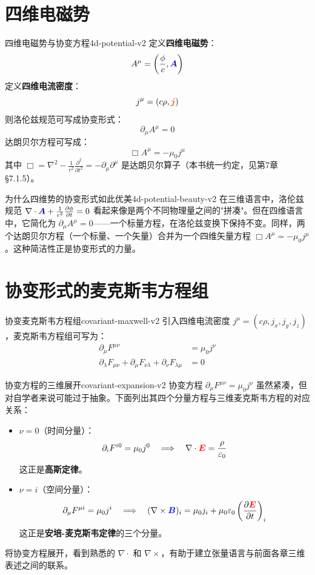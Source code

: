 \documentclass[11pt,a4paper,openany,oneside]{book}
\newcommand{\vecE}{\textcolor{red}{\vect{E}}}
\newcommand{\vecB}{\textcolor{blue}{\vect{B}}}
\newcommand{\vecJ}{\textcolor{cororange}{\vect{j}}}
\newcommand{\vecA}{\textcolor{blue!70!black}{\vect{A}}}
\newcommand{\eps}{\varepsilon}
\newcommand{\muz}{\mu_0}
\newcommand{\vect}[1]{\bm{#1}}
\newcommand{\curl}{\nabla\times}
\newcommand{\divg}{\nabla\cdot}
\newcommand{\lap}{\nabla^2}
\begin{document}
\section{四维电磁势}

\begin{theorem}{四维电磁势与协变方程}{4d-potential-v2}
定义\textbf{四维电磁势}：
\[
A^\mu = \left(\frac{\phi}{c}, \vecA\right)
\]
定义\textbf{四维电流密度}：
\[
j^\mu = (c\rho, \vecJ)
\]
则洛伦兹规范可写成协变形式：
\[
\partial_\mu A^\mu = 0
\]
达朗贝尔方程可写成：
\[
\Box A^\mu = -\muz j^\mu
\]
其中 $\Box = \lap - \frac{1}{c^2}\frac{\partial^2}{\partial t^2} = -\partial_\mu\partial^\mu$ 是达朗贝尔算子（本书统一约定，见第7章 §7.1.5）。
\end{theorem}

\begin{insight}{为什么四维势的协变形式如此优美}{4d-potential-beauty-v2}
在三维语言中，洛伦兹规范 $\divg\vecA + \frac{1}{c^2}\frac{\partial\phi}{\partial t} = 0$ 看起来像是两个不同物理量之间的"拼凑"。但在四维语言中，它简化为 $\partial_\mu A^\mu = 0$——一个标量方程，在洛伦兹变换下保持不变。同样，两个达朗贝尔方程（一个标量、一个矢量）合并为一个四维矢量方程 $\Box A^\mu = -\muz j^\mu$。这种简洁性正是协变形式的力量。
\end{insight}

\section{协变形式的麦克斯韦方程组}

\begin{theorem}{协变麦克斯韦方程组}{covariant-maxwell-v2}
引入四维电流密度 $j^\mu = (c\rho, j_x, j_y, j_z)$，麦克斯韦方程组可写为：
\begin{align}
\partial_\mu F^{\mu\nu} &= \muz j^\nu \label{eq:cov1} \\
\partial_\lambda F_{\mu\nu} + \partial_\mu F_{\nu\lambda} + \partial_\nu F_{\lambda\mu} &= 0 \label{eq:cov2}
\end{align}
\end{theorem}

\begin{review}{协变方程的三维展开}{covariant-expansion-v2}
协变方程 $\partial_\mu F^{\mu\nu} = \muz j^\nu$ 虽然紧凑，但对自学者来说可能过于抽象。下面列出其四个分量方程与三维麦克斯韦方程的对应关系：
\begin{itemize}
\item $\nu = 0$（时间分量）：
\[
\partial_i F^{i0} = \muz j^0 \quad\Longrightarrow\quad \divg\vecE = \frac{\rho}{\eps_0}
\]
这正是\textbf{高斯定律}。
\item $\nu = i$（空间分量）：
\[
\partial_\mu F^{\mu i} = \muz j^i \quad\Longrightarrow\quad (\curl\vecB)_i = \muz j_i + \muz\eps_0\left(\frac{\partial\vecE}{\partial t}\right)_i
\]
这正是\textbf{安培-麦克斯韦定律}的三个分量。
\end{itemize}
将协变方程展开，看到熟悉的 $\divg$ 和 $\curl$，有助于建立张量语言与前面各章三维表述之间的联系。
\end{review}
\end{document}
